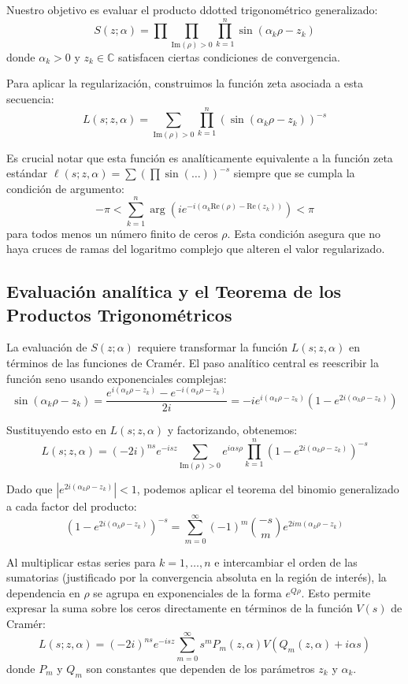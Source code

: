 Nuestro objetivo es evaluar el producto ddotted trigonométrico generalizado:
$$ S(z; \alpha) = \prod\prod_{\text{Im}(\rho)>0} \prod_{k=1}^n \sin(\alpha_k \rho - z_k) $$
donde $\alpha_k > 0$ y $z_k \in \mathbb{C}$ satisfacen ciertas condiciones de convergencia.

Para aplicar la regularización, construimos la función zeta asociada a esta secuencia:
$$ L(s; z, \alpha) = \sum_{\text{Im}(\rho)>0} \prod_{k=1}^n \left( \sin(\alpha_k \rho - z_k) \right)^{-s} $$

Es crucial notar que esta función es analíticamente equivalente a la función zeta estándar $\ell(s; z, \alpha) = \sum (\prod \sin(\dots))^{-s}$ siempre que se cumpla la condición de argumento:
$$ -\pi < \sum_{k=1}^n \arg\left( i e^{-i(\alpha_k \text{Re}(\rho) - \text{Re}(z_k))} \right) < \pi $$
para todos menos un número finito de ceros $\rho$. Esta condición asegura que no haya cruces de ramas del logaritmo complejo que alteren el valor regularizado.

\subsection{Evaluación analítica y el Teorema de los Productos Trigonométricos}

La evaluación de $S(z; \alpha)$ requiere transformar la función $L(s; z, \alpha)$ en términos de las funciones de Cramér. El paso analítico central es reescribir la función seno usando exponenciales complejas:
$$ \sin(\alpha_k \rho - z_k) = \frac{e^{i(\alpha_k \rho - z_k)} - e^{-i(\alpha_k \rho - z_k)}}{2i} = -i e^{i(\alpha_k \rho - z_k)} \left( 1 - e^{2i(\alpha_k \rho - z_k)} \right) $$

Sustituyendo esto en $L(s; z, \alpha)$ y factorizando, obtenemos:
$$ L(s; z, \alpha) = (-2i)^{ns} e^{-isz} \sum_{\text{Im}(\rho)>0} e^{i\alpha s \rho} \prod_{k=1}^n \left( 1 - e^{2i(\alpha_k \rho - z_k)} \right)^{-s} $$

Dado que $|e^{2i(\alpha_k \rho - z_k)}| < 1$, podemos aplicar el teorema del binomio generalizado a cada factor del producto:
$$ \left( 1 - e^{2i(\alpha_k \rho - z_k)} \right)^{-s} = \sum_{m=0}^{\infty} (-1)^m \binom{-s}{m} e^{2im(\alpha_k \rho - z_k)} $$

Al multiplicar estas series para $k=1, \dots, n$ e intercambiar el orden de las sumatorias (justificado por la convergencia absoluta en la región de interés), la dependencia en $\rho$ se agrupa en exponenciales de la forma $e^{Q \rho}$. Esto permite expresar la suma sobre los ceros directamente en términos de la función $V(s)$ de Cramér:
$$ L(s; z, \alpha) = (-2i)^{ns} e^{-isz} \sum_{m=0}^{\infty} s^m P_m(z, \alpha) V(Q_m(z, \alpha) + i\alpha s) $$
donde $P_m$ y $Q_m$ son constantes que dependen de los parámetros $z_k$ y $\alpha_k$.

